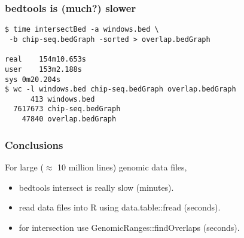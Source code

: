\documentclass{beamer}
\begin{document}
\begin{frame}[fragile]
  \frametitle{bedtools is (much?) slower}

\begin{verbatim}
$ time intersectBed -a windows.bed \
 -b chip-seq.bedGraph -sorted > overlap.bedGraph

real	154m10.653s
user	153m2.188s
sys	0m20.204s
$ wc -l windows.bed chip-seq.bedGraph overlap.bedGraph 
      413 windows.bed
  7617673 chip-seq.bedGraph
    47840 overlap.bedGraph
\end{verbatim}


  
\end{frame}

\begin{frame}
  \frametitle{Conclusions}
  For large ($\approx$ 10 million lines) genomic data files,
  \begin{itemize}
  \item bedtools intersect is really slow (minutes).
  \item read data files into R using data.table::fread (seconds).
  \item for intersection use GenomicRanges::findOverlaps (seconds).
  \end{itemize}
\end{frame}
\end{document}
